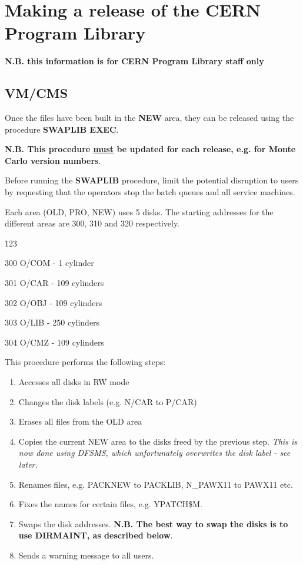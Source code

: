 \chapter{Making a release of the CERN Program Library}

{\bf N.B. this information is for CERN Program Library staff only}

\section{VM/CMS}

Once the files have been built in the {\bf NEW} area, they can be
released using the procedure {\bf SWAPLIB EXEC}. 

{\bf N.B. This procedure \underline{must} be updated for each
release, e.g. for Monte Carlo version numbers}.

Before running the {\bf SWAPLIB} procedure, limit the potential
disruption to users by requesting that the operators stop the
batch queues and all service machines.

Each area (OLD, PRO, NEW) uses 5 disks. The starting
addresses for the different areas are 300, 310 and 320 respectively.

\begin{DLtt}{123}
\item[300]O/COM - 1 cylinder
\item[301]O/CAR - 109 cylinders
\item[302]O/OBJ - 109 cylinders
\item[303]O/LIB - 250 cylinders
\item[304]O/CMZ - 109 cylinders
\end{DLtt}

This procedure performs the following steps:

\begin{enumerate}
\item
Accesses all disks in RW mode
\item
Changes the disk labels (e.g. N/CAR to P/CAR)
\item
Erases all files from the OLD area
\item
Copies the current NEW area to the disks freed by
the previous step. {\it This is now done using DFSMS,
which unfortunately overwrites the disk label - see later.}
\item
Renames files, e.g. PACKNEW to PACKLIB, N\_PAWX11 to PAWX11 etc.
\item
Fixes the names for certain files, e.g. YPATCH\$M.
\item
Swaps the disk addresses.
{\bf N.B. The best way to swap the disks is to use DIRMAINT, as described 
below}.
\item
Sends a warning message to all users.
\end{enumerate}

